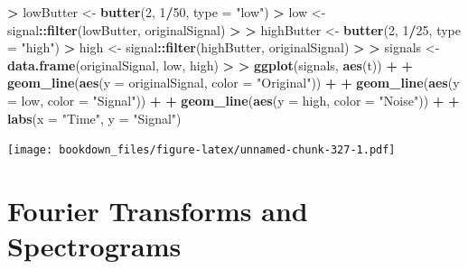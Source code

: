 \documentclass[]{krantz}
\makeatletter
\newenvironment{Shaded}{\begin{snugshade}}{\end{snugshade}}
\newcommand{\KeywordTok}[1]{\textcolor[rgb]{0.27,0.27,0.27}{\textbf{#1}}}
\newcommand{\DataTypeTok}[1]{\textcolor[rgb]{0.27,0.27,0.27}{#1}}
\newcommand{\DecValTok}[1]{\textcolor[rgb]{0.06,0.06,0.06}{#1}}
\newcommand{\StringTok}[1]{\textcolor[rgb]{0.5,0.5,0.5}{#1}}
\newcommand{\OperatorTok}[1]{\textcolor[rgb]{0.43,0.43,0.43}{\textbf{#1}}}
\newcommand{\ErrorTok}[1]{\textcolor[rgb]{0.14,0.14,0.14}{\textbf{#1}}}
\newcommand{\NormalTok}[1]{#1}
\newenvironment{kframe}{%
\medskip{}
\setlength{\fboxsep}{.8em}
 \def\at@end@of@kframe{}%
 \ifinner\ifhmode%
  \def\at@end@of@kframe{\end{minipage}}%
  \begin{minipage}{\columnwidth}%
 \fi\fi%
 \def\FrameCommand##1{\hskip\@totalleftmargin \hskip-\fboxsep
 \colorbox{shadecolor}{##1}\hskip-\fboxsep
     \hskip-\linewidth \hskip-\@totalleftmargin \hskip\columnwidth}%
 \MakeFramed {\advance\hsize-\width
   \@totalleftmargin\z@ \linewidth\hsize
   \@setminipage}}%
 {\par\unskip\endMakeFramed%
 \at@end@of@kframe}
\renewenvironment{Shaded}{\begin{kframe}}{\end{kframe}}
\makeatother
\begin{document}
\begin{Shaded}
\begin{Highlighting}[]
\OperatorTok{>}\StringTok{ }\NormalTok{lowButter <-}\StringTok{ }\KeywordTok{butter}\NormalTok{(}\DecValTok{2}\NormalTok{, }\DecValTok{1}\OperatorTok{/}\DecValTok{50}\NormalTok{, }\DataTypeTok{type =} \StringTok{"low"}\NormalTok{)}
\OperatorTok{>}\StringTok{ }\NormalTok{low <-}\StringTok{ }\NormalTok{signal}\OperatorTok{::}\KeywordTok{filter}\NormalTok{(lowButter, originalSignal)}
\OperatorTok{>}\StringTok{ }
\ErrorTok{>}\StringTok{ }\NormalTok{highButter <-}\StringTok{ }\KeywordTok{butter}\NormalTok{(}\DecValTok{2}\NormalTok{, }\DecValTok{1}\OperatorTok{/}\DecValTok{25}\NormalTok{, }\DataTypeTok{type =} \StringTok{"high"}\NormalTok{)}
\OperatorTok{>}\StringTok{ }\NormalTok{high <-}\StringTok{ }\NormalTok{signal}\OperatorTok{::}\KeywordTok{filter}\NormalTok{(highButter, originalSignal)}
\OperatorTok{>}\StringTok{ }
\ErrorTok{>}\StringTok{ }\NormalTok{signals <-}\StringTok{ }\KeywordTok{data.frame}\NormalTok{(originalSignal, low, high)}
\OperatorTok{>}\StringTok{ }
\ErrorTok{>}\StringTok{ }\KeywordTok{ggplot}\NormalTok{(signals, }\KeywordTok{aes}\NormalTok{(t)) }\OperatorTok{+}\StringTok{ }
\OperatorTok{+}\StringTok{   }\KeywordTok{geom_line}\NormalTok{(}\KeywordTok{aes}\NormalTok{(}\DataTypeTok{y =}\NormalTok{ originalSignal, }\DataTypeTok{color =} \StringTok{"Original"}\NormalTok{)) }\OperatorTok{+}\StringTok{ }
\OperatorTok{+}\StringTok{   }\KeywordTok{geom_line}\NormalTok{(}\KeywordTok{aes}\NormalTok{(}\DataTypeTok{y =}\NormalTok{ low, }\DataTypeTok{color =} \StringTok{"Signal"}\NormalTok{)) }\OperatorTok{+}\StringTok{ }
\OperatorTok{+}\StringTok{   }\KeywordTok{geom_line}\NormalTok{(}\KeywordTok{aes}\NormalTok{(}\DataTypeTok{y =}\NormalTok{ high, }\DataTypeTok{color =} \StringTok{"Noise"}\NormalTok{)) }\OperatorTok{+}\StringTok{ }
\OperatorTok{+}\StringTok{   }\KeywordTok{labs}\NormalTok{(}\DataTypeTok{x =} \StringTok{"Time"}\NormalTok{, }\DataTypeTok{y =} \StringTok{"Signal"}\NormalTok{)}
\end{Highlighting}
\end{Shaded}

\texttt{[image: bookdown\_files/figure-latex/unnamed-chunk-327-1.pdf]}

\section{Fourier Transforms and
Spectrograms}\label{fourier-transforms-and-spectrograms}
\end{document}
